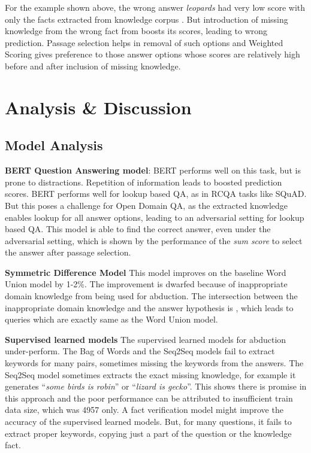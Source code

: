 \documentclass[11pt,a4paper]{article}
\begin{document}
For the example shown above, the wrong answer \textit{leopards} had very low score with only the facts extracted from knowledge corpus . But introduction of missing knowledge from the wrong fact from   boosts its scores, leading to wrong prediction. Passage selection helps in removal of such options and Weighted Scoring gives preference to those answer options whose scores are relatively high before and after inclusion of missing knowledge.


\section{Analysis \& Discussion}
\subsection{Model Analysis}




\textbf{BERT Question Answering model}:
BERT performs well on this task, but is prone to distractions. Repetition of information leads to boosted prediction scores. BERT performs well for lookup based QA, as in RCQA tasks like SQuAD. But this poses a challenge for Open Domain QA, as the extracted knowledge enables lookup for all answer options, leading to an adversarial setting for lookup based QA. This model is able to find the correct answer, even under the adversarial setting, which is shown by the performance of the \textit{sum score} to select the answer after passage selection.
     
    \textbf{Symmetric Difference Model}
     This model improves on the baseline Word Union model by 1-2\%. The improvement is dwarfed because of inappropriate domain knowledge from  being used for abduction. The intersection between the inappropriate domain knowledge and the answer hypothesis is , which leads to queries which are exactly same as the Word Union model.
    
    \textbf{Supervised learned models}
     The supervised learned models for abduction under-perform. The Bag of Words and the Seq2Seq models fail to extract keywords for many  pairs, sometimes missing the keywords from the answers. The Seq2Seq model sometimes extracts the exact missing knowledge, for example it generates ``\textit{some birds is robin}'' or ``\textit{lizard is gecko}''. This shows there is promise in this approach and the poor performance can be attributed to insufficient train data size, which was 4957 only. A fact verification model might improve the accuracy of the supervised learned models. But, for many questions, it fails to extract proper keywords, copying just a part of the question or the knowledge fact. 
\end{document}
